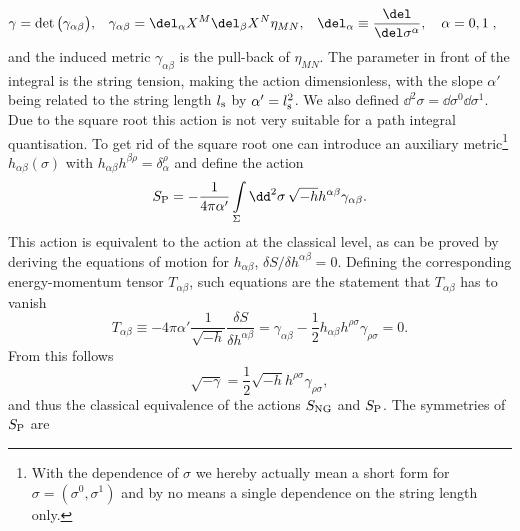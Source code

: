 %
%
\begin{align}
\gamma &= \det \big(\gamma_{\alpha\beta}\big), & \gamma_{\alpha\beta} &= \del_{\alpha}X^{M}\del_{\beta}X^{N}\eta_{MN}, & \del_{\alpha}&\equiv \frac{\del}{\del\sigma^{\alpha}},\quad \alpha=0,1\;,
\end{align}
%
%
and the induced metric $\gamma_{\alpha\beta}$ is the pull-back of $\eta_{MN}$. The parameter in front of the integral is the string tension, making the action dimensionless, with the  slope $\alpha'$ being related to the string length $l_{\rm s}$ by $\alpha'=l_{\rm s}^{2}$. We also defined $\dd^{2}\sigma = \dd\sigma^{0}\dd\sigma^{1}$. Due to the square root this action is not very suitable for a path integral quantisation. To get rid of the square root one can introduce an auxiliary metric\footnote{With the dependence of $\sigma$ we hereby actually mean a short form for $\sigma=(\sigma^{0},\sigma^{1})$ and by no means a single dependence on the string length only.} $h_{\alpha\beta}(\sigma)$ with $h_{\alpha\beta}h^{\beta\rho}=\delta_{\alpha}^{\rho}$ and define the  action
%
%
\begin{equation}
S_{\rm P} = -\frac{1}{4\pi\alpha'} \int\limits_{\Sigma}\dd^{2}\sigma\, \sqrt{-h}h^{\alpha\beta}\gamma_{\alpha\beta}.
\end{equation}
%
%
This action is equivalent to the  action at the classical level, as can be proved by deriving the equations of motion for $h_{\alpha\beta}$, $\delta S/ \delta h^{\alpha\beta} = 0$. Defining the corresponding energy-momentum tensor $T_{\alpha\beta}$, such equations are the statement that $T_{\alpha\beta}$ has to vanish
%
%
\begin{equation}
T_{\alpha\beta} \equiv -4\pi\alpha' \frac{1}{\sqrt{-h}} \frac{\delta S}{\delta h^{\alpha\beta}} = \gamma_{\alpha\beta} - \frac{1}{2} h_{\alpha\beta} h^{\rho\sigma}\gamma_{\rho\sigma} = 0.
\end{equation}
%
%
From this follows
%
%
\begin{equation}
\sqrt{-\gamma} = \frac{1}{2} \sqrt{-h} h^{\rho\sigma} \gamma_{\rho\sigma},
\end{equation}
%
%
and thus the classical equivalence of the actions $S_{\rm NG}$ and $S_{\rm P}$. The symmetries of $S_{\rm P}$ are
%
%
